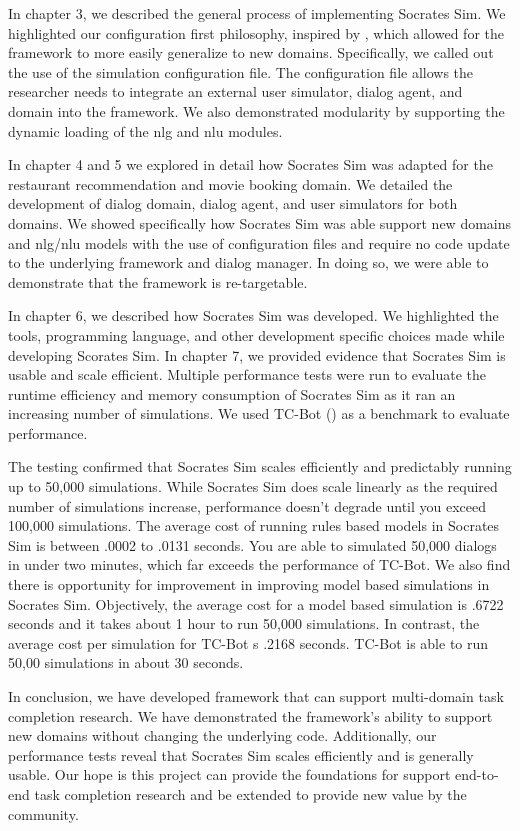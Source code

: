 In chapter 3, we described the general process of implementing Socrates Sim. We highlighted our configuration first philosophy, inspired by \cite{Gardner_allennlp}, which allowed for the framework to more easily generalize to new domains. Specifically, we called out the use of the simulation configuration file. The configuration file allows the researcher needs to integrate an external user simulator, dialog agent, and domain into the framework. We also demonstrated modularity by supporting the dynamic loading of the nlg and nlu modules.

In chapter 4 and 5 we explored in detail how Socrates Sim was adapted for the restaurant recommendation and movie booking domain. 
We detailed the development of dialog domain, dialog agent, and user simulators for both domains. We showed specifically how Socrates Sim was able support new domains and nlg/nlu models with the use of configuration files and require no code update to the underlying framework and dialog manager. In doing so, we were able to demonstrate that the  framework is re-targetable. 
  
In chapter 6, we described how Socrates Sim was developed. We highlighted the tools, programming language, and other development specific choices made while developing Scorates Sim. In chapter 7, we provided evidence that Socrates Sim is usable and scale efficient. Multiple performance tests were run to evaluate the runtime efficiency and memory consumption of Socrates Sim as it ran an increasing number of simulations. We used TC-Bot (\cite{li_end_to_end}) as a benchmark to evaluate performance. 

The testing confirmed that Socrates Sim scales efficiently and predictably running up to 50,000 simulations. While Socrates Sim does scale linearly as the required number of  simulations increase, performance doesn't degrade until you exceed 100,000 simulations. The average cost of running rules based models in Socrates Sim is between .0002 to .0131 seconds. You are able to simulated 50,000 dialogs in under two minutes, which far exceeds the performance of TC-Bot. We also find there is opportunity for improvement in improving model based simulations in Socrates Sim. Objectively, the average cost for a model based simulation is .6722 seconds and it takes about 1 hour to run 50,000 simulations. In contrast, the average cost per simulation for TC-Bot s .2168 seconds. TC-Bot is able to run 50,00 simulations in about 30 seconds. 
 
In conclusion, we have developed framework that can support multi-domain task completion research. We have demonstrated the framework's ability to support new domains without changing the underlying code. Additionally, our performance tests reveal that Socrates Sim scales efficiently and is generally usable. Our hope is this project can provide the foundations for support end-to-end task completion research and be extended to provide new value by the community.

